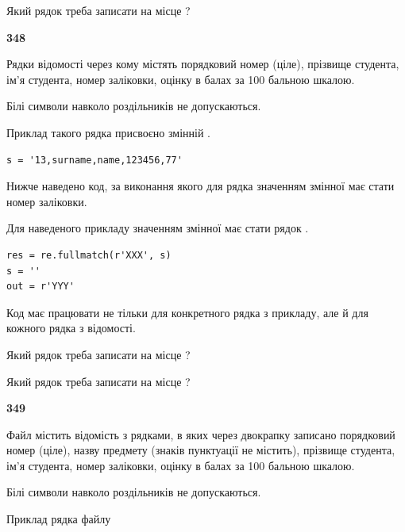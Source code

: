 Який рядок треба записати на місце  ?\par


\newpage

{\begin {center}\textbf{ 348}\end {center}}\par
Рядки відомості через кому містять порядковий номер (ціле), пріз\-ви\-ще студен\-та, ім'я студента, номер заліковки, оцінку в балах за 100 бальною шкалою.

Білі символи навколо роздільників не допускаються.

Приклад такого рядка присвоєно змінній .



\begin{verbatim}
s = '13,surname,name,123456,77'
\end{verbatim}


Нижче наведено код, за виконання якого для рядка  значенням змінної  має стати номер заліковки.

Для наведеного прикладу значенням змінної  має стати рядок  .



\begin{verbatim}
res = re.fullmatch(r'XXX', s)
s = ''
out = r'YYY'
\end{verbatim}


Код має працювати не тільки для конкретного рядка з прикладу, але й для кожного рядка з відомості.




Який рядок треба записати на місце  ?\par
\vspace{5mm}


Який рядок треба записати на місце  ?\par


\newpage

{\begin {center}\textbf{ 349}\end {center}}\par
Файл  містить відомість з рядками, в яких через двокрапку записано поряд\-ковий номер (ціле), назву предмету (знаків пунктуації не містить), прізвище студента, ім'я студента, номер заліковки, оцінку в балах за 100 бальною шкалою.

Білі символи навколо роздільників не допускаються.

Приклад рядка файлу



